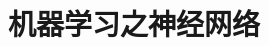 \documentclass[12pt]{beamer}
\begin{document}
\title{\bf\Huge 机器学习之神经网络}
\author{}

\begin{frame}
  \titlepage
\end{frame}

%
%
%
%
%
%
%
%
%
%
%
%
%
%
%
%
\end{document}
